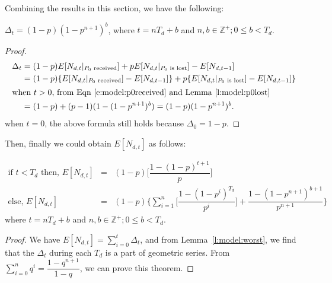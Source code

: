     Combining the results in this section, we have the following:
    \begin{lemma}
    \label{l:model:worst}
        $\Delta_t = (1-p)(1-p^{n+1})^b$,
where $t=nT_d+b$ and $n,b\in\mathbb{Z^+}; 0 \le b<T_d$.
    \end{lemma}
    \if{}
    \begin{proof}
    \begin{align*}
    \Delta_t &= (1-p)E[N_{d,t}|_\textrm{$P_0$ received}] + pE[N_{d,t}|_{\textrm{$P_0$ is lost}}]
    - E[N_{d,t-1}]\\
             &= (1-p)\{E[N_{d,t}|_\textrm{$P_0$ received}] - E[N_{d, t-1}]\} 
             + p\{E[N_{d,t}|_{\textrm{$P_0$ is lost}}] - E[N_{d, t-1}]\}\\
    \intertext{when $t>0$, from Eqn \ref{e:model:p0received} and Lemma~\ref{l:model:p0lost}}
             &= (1-p)+(p-1)(1-(1-p^{n+1})^b)=(1-p)(1-p^{n+1})^b.
    \end{align*}
    when $t=0$, the above formula still holds because $\Delta_0 = 1-p$.
    \end{proof}
    \fi

    Then, finally we could obtain $E[N_{d,t}]$ as
    follows:
    \begin{theorem}
    \label{t:model:worst}
    \begin{eqnarray*}
       \textrm{if $t<T_d$ then, } E[N_{d,t}] &=& (1-p)\Big[\dfrac{1-(1-p)^{t+1}}{p}\Big]\\ 
       \textrm{else, } E[N_{d,t}] &=& (1-p)\Big\{\sum_{i=1}^n\Big[\dfrac{1-(1-p^i)^{T_d}}{p^i}\Big] +
       \dfrac{1-(1-p^{n+1})^{b+1}}{p^{n+1}}\Big\}
    \end{eqnarray*}
    where $t=nT_d+b$ and $n,b\in\mathbb{Z^+}; 0 \le b<T_d$.
    \end{theorem}
    \begin{proof}
    We have $E[N_{d,t}] = \sum_{i=0}^{t}\Delta_t$, and from Lemma~\ref{l:model:worst}, we
    find that the $\Delta_t$ during each $T_d$ is a part of geometric series. From
    $\sum_{i=0}^nq^i = \dfrac{1-q^{n+1}}{1-q}$, we can prove this theorem.
    \end{proof}

